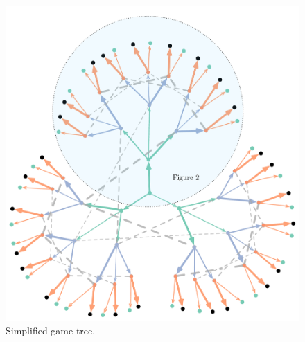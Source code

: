 \begin{figure}[H]
\begin{adjustbox}{center}
\includegraphics[width=0.43\paperwidth]{figures/rounded_clover_infosets}
\end{adjustbox}
\caption{Simplified game tree.}

\label{fig:simple_tree}
\end{figure}

